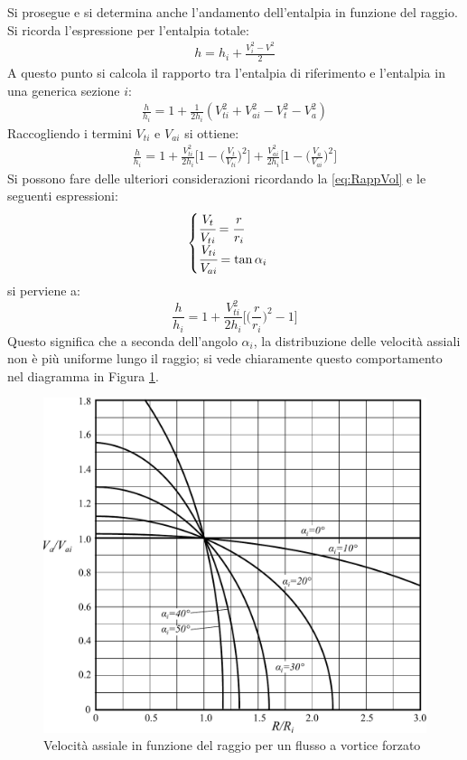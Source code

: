 Si prosegue e si determina anche l'andamento dell'entalpia in funzione del raggio. Si ricorda l'espressione per l'entalpia totale:
\begin{align*}
h = h_i + \frac{V_i^2 - V^2}{2}
\end{align*}
A questo punto si calcola il rapporto tra l'entalpia di riferimento e l'entalpia in una generica sezione $i$:
\begin{align*}
\frac{h}{h_i} = 1+ \frac{1}{2 h_i} (V_{ti}^2 + V_{ai}^2- V_t^2 -V_a^2)
\end{align*}
Raccogliendo i termini $V_{ti}$ e $V_{ai}$ si ottiene:
\begin{align*}
\frac{h}{h_i} = 1+ \frac{V_{ti}^2}{2 h_i} \bigg[ 1- \bigg( \frac{V_t}{V_{ti}} \bigg)^2 \bigg] + \frac{V_{ai}^2}{2 h_i} \bigg[ 1- \bigg( \frac{V_a}{V_{ai}} \bigg)^2 \bigg]
\end{align*}
Si possono fare delle ulteriori considerazioni ricordando la \ref{eq:RappVol} e le seguenti espressioni:
\begin{align*}
\begin{cases}
\cfrac{V_t}{V_{ti}} = \cfrac{r}{r_i}\\
\cfrac{V_{ti}}{V_{ai}} = \tan \alpha_i
\end{cases}
\end{align*}
si perviene a:
\begin{equation}
\boxed{ \frac{h}{h_i} = 1+ \frac{V_{ti}^2}{2h_i} \bigg[ \bigg( \frac{r}{r_i} \bigg)^2 -1 \bigg] }
\label{eq:rappEntalpie}
\end{equation}
Questo significa che a seconda dell'angolo $\alpha_i$, la distribuzione delle velocità assiali non è più uniforme lungo il raggio; si vede chiaramente questo comportamento nel diagramma in Figura \ref{fig:TurboFan}.
\begin{figure}
\centering
  \includegraphics[width=.8\textwidth]{fig/VortForz.pdf}
\caption{Velocità assiale in funzione del raggio per un flusso a vortice forzato}
\label{fig:TurboFan}
\end{figure}
